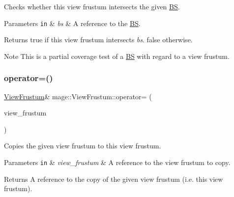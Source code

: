 Checks whether this view frustum intersects the given \hyperlink{structmage_1_1_b_s}{BS}.


\begin{DoxyParams}[1]{Parameters}
\mbox{\tt in}  & {\em bs} & A reference to the \hyperlink{structmage_1_1_b_s}{BS}. \\
\hline
\end{DoxyParams}
\begin{DoxyReturn}{Returns}
{\ttfamily true} if this view frustum intersects {\itshape bs}. {\ttfamily false} otherwise. 
\end{DoxyReturn}
\begin{DoxyNote}{Note}
This is a partial coverage test of a \hyperlink{structmage_1_1_b_s}{BS} with regard to a view frustum. 
\end{DoxyNote}
\hypertarget{structmage_1_1_view_frustum_add514821f691117c0ab139c13f86ef70}{}\label{structmage_1_1_view_frustum_add514821f691117c0ab139c13f86ef70} 
\subsubsection{\texorpdfstring{operator=()}{operator=()}\hspace{0.1cm}{\footnotesize\ttfamily [1/2]}}
{\footnotesize\ttfamily \hyperlink{structmage_1_1_view_frustum}{View\+Frustum}\& mage\+::\+View\+Frustum\+::operator= (\begin{DoxyParamCaption}\item[{const \hyperlink{structmage_1_1_view_frustum}{View\+Frustum} \&}]{view\+\_\+frustum }\end{DoxyParamCaption})\hspace{0.3cm}{\ttfamily [default]}}

Copies the given view frustum to this view frustum.


\begin{DoxyParams}[1]{Parameters}
\mbox{\tt in}  & {\em view\+\_\+frustum} & A reference to the view frustum to copy. \\
\hline
\end{DoxyParams}
\begin{DoxyReturn}{Returns}
A reference to the copy of the given view frustum (i.\+e. this view frustum). 
\end{DoxyReturn}
\hypertarget{structmage_1_1_view_frustum_a0167f34c3ba505155ed6064c6d98a99c}{}\label{structmage_1_1_view_frustum_a0167f34c3ba505155ed6064c6d98a99c} 
